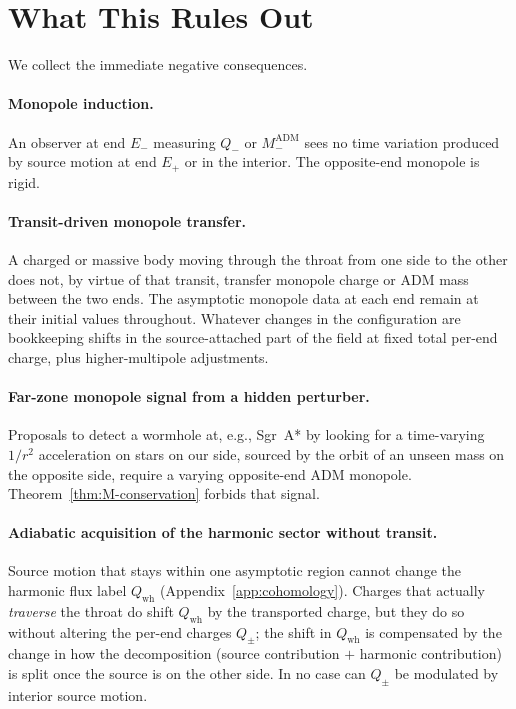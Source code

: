 \documentclass[aps,prd,onecolumn,nofootinbib,superscriptaddress]{revtex4-2}
\begin{document}
\section{What This Rules Out}
\label{sec:ruled-out}

We collect the immediate negative consequences.

\paragraph*{Monopole induction.} An observer at end $E_-$ measuring $Q_-$ or $M_-^{\mathrm{ADM}}$ sees no time variation produced by source motion at end $E_+$ or in the interior. The opposite-end monopole is rigid.

\paragraph*{Transit-driven monopole transfer.} A charged or massive body moving through the throat from one side to the other does not, by virtue of that transit, transfer monopole charge or ADM mass between the two ends. The asymptotic monopole data at each end remain at their initial values throughout. Whatever changes in the configuration are bookkeeping shifts in the source-attached part of the field at fixed total per-end charge, plus higher-multipole adjustments.

\paragraph*{Far-zone monopole signal from a hidden perturber.} Proposals to detect a wormhole at, e.g., Sgr~A* by looking for a time-varying $1/r^2$ acceleration on stars on our side, sourced by the orbit of an unseen mass on the opposite side,\cite{DaiStojkovic2019Observing,SimonettiEtAl2021SensitiveSearches} require a varying opposite-end ADM monopole. Theorem~\ref{thm:M-conservation} forbids that signal.

\paragraph*{Adiabatic acquisition of the harmonic sector without transit.} Source motion that stays within one asymptotic region cannot change the harmonic flux label $Q_{\mathrm{wh}}$ (Appendix~\ref{app:cohomology}). Charges that actually \emph{traverse} the throat do shift $Q_{\mathrm{wh}}$ by the transported charge, but they do so without altering the per-end charges $Q_\pm$; the shift in $Q_{\mathrm{wh}}$ is compensated by the change in how the decomposition (source contribution $+$ harmonic contribution) is split once the source is on the other side. In no case can $Q_\pm$ be modulated by interior source motion.
\end{document}
